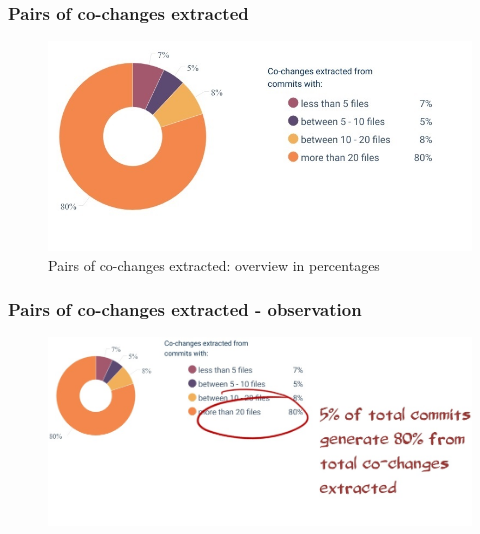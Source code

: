 \documentclass{beamer}
\begin{document}

 \begin{frame}
\frametitle{Pairs of co-changes extracted }
\vskip 0.2cm
\begin{center}
     \begin{figure}
	\includegraphics[width=\textwidth]{extracted_co.jpg}
	\caption{\label{fig:fig5}Pairs of co-changes extracted: overview in percentages}
     \end{figure}
\end{center}

\end{frame}


 \begin{frame}
\frametitle{Pairs of co-changes extracted - observation }
\vskip 0.2cm
\begin{center}
     \begin{figure}
	\includegraphics[width=\textwidth]{extracted_co2.jpg}
     \end{figure}
\end{center}

\end{frame}


\end{document}
